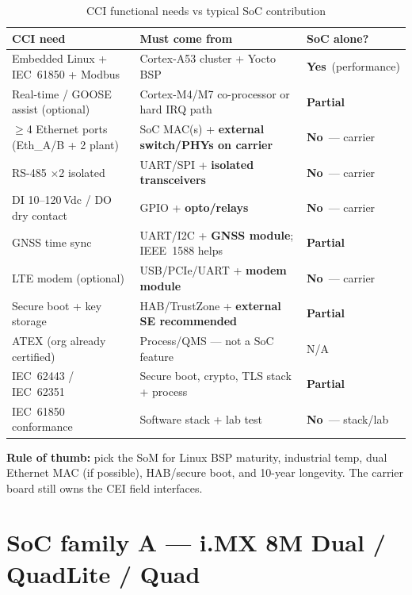 \documentclass[10pt,a4paper]{article}
\newcommand{\yes}{\textcolor{okG}{\textbf{Yes}}}
\newcommand{\no}{\textcolor{needR}{\textbf{No}}}
\newcommand{\partly}{\textcolor{warnA}{\textbf{Partial}}}
\begin{document}
\begin{table}[htbp]
\centering
\caption{CCI functional needs vs typical SoC contribution}
\label{tab:needs}
\renewcommand{\arraystretch}{1.1}
\small
\begin{tabularx}{\linewidth}{@{}>{\raggedright\arraybackslash}p{3.2cm}>{\RaggedRight\arraybackslash}X>{\raggedright\arraybackslash}p{3.4cm}@{}}
\toprule
\textbf{CCI need} & \textbf{Must come from} & \textbf{SoC alone?} \\
\midrule
Embedded Linux + IEC~61850 + Modbus & Cortex-A53 cluster + Yocto BSP & \yes\ (performance) \\
Real-time / GOOSE assist (optional) & Cortex-M4/M7 co-processor or hard IRQ path & \partly \\
$\geq$4 Ethernet ports (Eth\_A/B + 2 plant) & SoC MAC(s) + \textbf{external switch/PHYs on carrier} & \no\ --- carrier \\
RS-485 $\times$2 isolated & UART/SPI + \textbf{isolated transceivers} & \no\ --- carrier \\
DI 10--120\,Vdc / DO dry contact & GPIO + \textbf{opto/relays} & \no\ --- carrier \\
GNSS time sync & UART/I2C + \textbf{GNSS module}; IEEE~1588 helps & \partly \\
LTE modem (optional) & USB/PCIe/UART + \textbf{modem module} & \no\ --- carrier \\
Secure boot + key storage & HAB/TrustZone + \textbf{external SE recommended} & \partly \\
ATEX (org already certified) & Process/QMS --- not a SoC feature & N/A \\
IEC~62443 / IEC~62351 & Secure boot, crypto, TLS stack + process & \partly \\
IEC~61850 conformance & Software stack + lab test & \no\ --- stack/lab \\
\bottomrule
\end{tabularx}
\end{table}

\noindent
\textbf{Rule of thumb:} pick the SoM for Linux BSP maturity, industrial temp, dual Ethernet MAC (if possible), HAB/secure boot, and 10-year longevity.
The carrier board still owns the CEI field interfaces.

\section{SoC family A --- i.MX 8M Dual / QuadLite / Quad}
\label{sec:imx8m}
\end{document}
